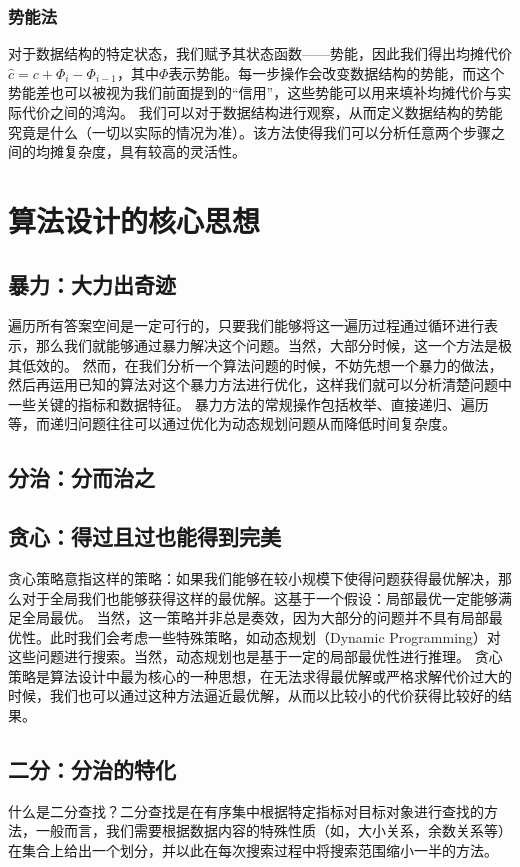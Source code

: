 \documentclass[12pt,a4paper,UTF16]{ctexbook}
\theoremstyle{plain}
\begin{document}
\subsection{势能法}
对于数据结构的特定状态，我们赋予其状态函数——势能，因此我们得出均摊代价$\hat{c}=c+\Phi_i -\Phi _{i-1}$，其中$\Phi$表示势能。每一步操作会改变数据结构的势能，而这个势能差也可以被视为我们前面提到的“信用”，这些势能可以用来填补均摊代价与实际代价之间的鸿沟。
我们可以对于数据结构进行观察，从而定义数据结构的势能究竟是什么（一切以实际的情况为准）。该方法使得我们可以分析任意两个步骤之间的均摊复杂度，具有较高的灵活性。
\chapter{算法设计的核心思想}
\section{暴力：大力出奇迹}
遍历所有答案空间是一定可行的，只要我们能够将这一遍历过程通过循环进行表示，那么我们就能够通过暴力解决这个问题。当然，大部分时候，这一个方法是极其低效的。
然而，在我们分析一个算法问题的时候，不妨先想一个暴力的做法，然后再运用已知的算法对这个暴力方法进行优化，这样我们就可以分析清楚问题中一些关键的指标和数据特征。
暴力方法的常规操作包括枚举、直接递归、遍历等，而递归问题往往可以通过优化为动态规划问题从而降低时间复杂度。
\section{分治：分而治之}
\section{贪心：得过且过也能得到完美}
贪心策略意指这样的策略：如果我们能够在较小规模下使得问题获得最优解决，那么对于全局我们也能够获得这样的最优解。这基于一个假设：局部最优一定能够满足全局最优。
当然，这一策略并非总是奏效，因为大部分的问题并不具有局部最优性。此时我们会考虑一些特殊策略，如动态规划（Dynamic Programming）对这些问题进行搜索。当然，动态规划也是基于一定的局部最优性进行推理。
贪心策略是算法设计中最为核心的一种思想，在无法求得最优解或严格求解代价过大的时候，我们也可以通过这种方法逼近最优解，从而以比较小的代价获得比较好的结果。
\section{二分：分治的特化}
什么是二分查找？二分查找是在有序集中根据特定指标对目标对象进行查找的方法，一般而言，我们需要根据数据内容的特殊性质（如，大小关系，余数关系等）在集合上给出一个划分，并以此在每次搜索过程中将搜索范围缩小一半的方法。
\end{document}
